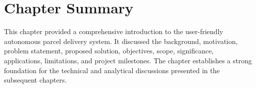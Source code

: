 \section{Chapter Summary}

This chapter provided a comprehensive introduction to the user-friendly autonomous parcel delivery system. It discussed the background, motivation, problem statement, proposed solution, objectives, scope, significance, applications, limitations, and project milestones. The chapter establishes a strong foundation for the technical and analytical discussions presented in the subsequent chapters.